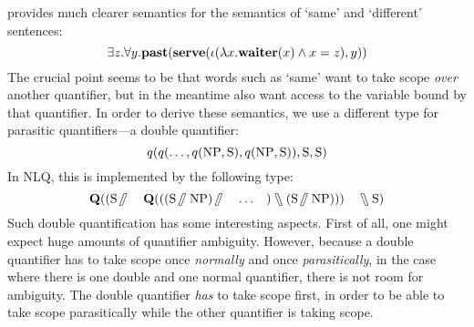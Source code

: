 \citet{kiselyov2015b} provides much clearer semantics for the semantics
of `same' and `different' sentences:
\[
  \exists{z}.\forall{y}.\mathbf{past}(\mathbf{serve}(\iota(\lambda{x}.\mathbf{waiter}(x)\wedge{x=z}),y))
\]
The crucial point seems to be that words such as `same' want to take
scope \emph{over} another quantifier, but in the meantime also want
access to the variable bound by that quantifier. In order to derive
these semantics, we use a different type for parasitic quantifiers---a
double quantifier:
\[
  q(q(\ldots,q(\text{NP},\text{S}),q(\text{NP},\text{S})),\text{S},\text{S})
\]
In NLQ, this is implemented by the following type:
\[
  \q[(\S\himpl\quad{\q[((\S\himpl\NP)\himpl\quad\ldots\quad)\himpr(\S\himpl\NP)]})\quad\himpr\S]
\]
Such double quantification has some interesting aspects. First of all,
one might expect huge amounts of quantifier ambiguity. However,
because a double quantifier has to take scope once \emph{normally} and
once \emph{parasitically}, in the case where there is one double and
one normal quantifier, there is not room for ambiguity. The double
quantifier \emph{has} to take scope first, in order to be able to take
scope parasitically while the other quantifier is taking scope.

